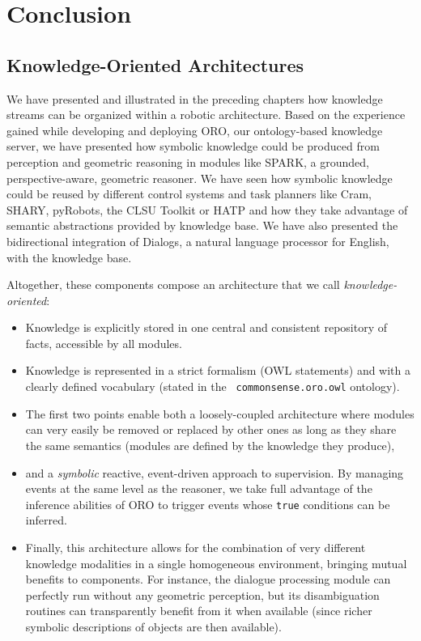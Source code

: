 \chapter{Conclusion}
\label{chapter|conclusion}

\section{Knowledge-Oriented Architectures}

We have presented and illustrated in the preceding chapters how knowledge
streams can be organized within a robotic architecture. Based on the experience
gained while developing and deploying {\sc ORO}, our ontology-based knowledge
server, we have presented how symbolic knowledge could be produced from
perception and geometric reasoning in modules like {\sc SPARK}, a grounded,
perspective-aware, geometric reasoner. We have seen how symbolic knowledge
could be reused by different control systems and task planners like {\sc Cram},
{\sc SHARY}, {\sc pyRobots}, the {\sc CLSU Toolkit} or {\sc HATP} and how they
take advantage of semantic abstractions provided by knowledge base. We have
also presented the bidirectional integration of {\sc Dialogs}, a natural
language processor for English, with the knowledge base.

Altogether, these components compose an architecture that we call
\emph{knowledge-oriented}:

\begin{itemize}
    
    \item{Knowledge is explicitly stored in one central and consistent
    repository of facts, accessible by all modules.} 

    \item{Knowledge is represented in a strict formalism (OWL statements) and
    with a clearly defined vocabulary (stated in the {\tt
    commonsense.oro.owl} ontology).} 

    \item{The first two points enable both a loosely-coupled architecture where
    modules can very easily be removed or replaced by other ones as long as
    they share the same semantics (modules are defined by the knowledge they
    produce),} 

    \item{and a \emph{symbolic} reactive, event-driven approach to supervision.
    By managing events at the same level as the reasoner, we take full
    advantage of the inference abilities of ORO to trigger events whose
    \texttt{true} conditions can be inferred.} 

    \item{Finally, this architecture allows for the combination of very
    different knowledge modalities in a single homogeneous environment,
    bringing mutual benefits to components. For instance, the dialogue
    processing module can perfectly run without any geometric
    perception, but its disambiguation routines can transparently
    benefit from it when available (since richer symbolic descriptions of
    objects are then available).}

\end{itemize}

